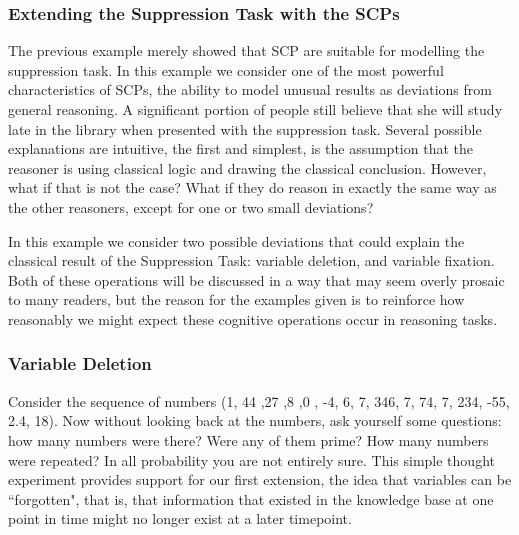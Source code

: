 \documentclass{article}
\begin{document}
\subsubsection{Extending the Suppression Task with the SCPs}
The previous example merely showed that SCP are suitable for modelling the suppression task. In this example we consider one of the most powerful characteristics of SCPs, the ability to model unusual results as deviations from general reasoning. A significant portion of people still believe that she will study late in the library when presented with the suppression task. Several possible explanations are intuitive, the first and simplest, is the assumption that the reasoner is using classical logic and drawing the classical conclusion. However, what if that is not the case? What if they do reason in exactly the same way as the other reasoners, except for one or two small deviations?

In this example we consider two possible deviations that could explain the classical result of the Suppression Task: variable deletion, and variable fixation. Both of these operations will be discussed in a way that may seem overly prosaic to many readers, but the reason for the examples given is to reinforce how reasonably we might expect these cognitive operations occur in reasoning tasks.

\subsubsection*{Variable Deletion}

Consider the sequence of numbers (1, 44 ,27 ,8 ,0 , -4, 6, 7, 346, 7, 74, 7, 234, -55, 2.4, 18). Now without looking back at the numbers, ask yourself some questions: how many numbers were there? Were any of them prime? How many numbers were repeated? In all probability you are not entirely sure. This simple thought experiment provides support for our first extension, the idea that variables can be ``forgotten", that is, that information that existed in the knowledge base at one point in time might no longer exist at a later timepoint. 
\end{document}

